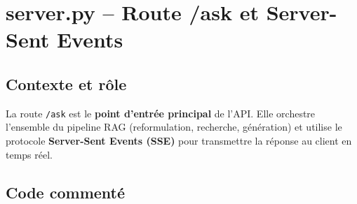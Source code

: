 \documentclass[12pt,a4paper]{report}
\begin{document}
\section{server.py -- Route /ask et Server-Sent Events}

\subsection{Contexte et r\^{o}le}

La route \texttt{/ask} est le \textbf{point d'entr\'{e}e principal} de l'API. Elle orchestre
l'ensemble du pipeline RAG (reformulation, recherche, g\'{e}n\'{e}ration) et utilise le protocole
\textbf{Server-Sent Events (SSE)} pour transmettre la r\'{e}ponse au client en temps r\'{e}el.

\subsection{Code comment\'{e}}
\end{document}
